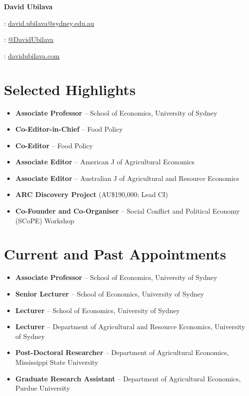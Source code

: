 \documentclass[10pt]{article}
\begin{document}
	
	
	
	\hspace{0.00in}\Large{\bfseries{David Ubilava \faGraduationCap}}
	\normalsize
	
	\medskip
	
	{\faEnvelope: \href{mailto:david.ubilava@sydney.edu.au}{david.ubilava@sydney.edu.au}}
	
	\smallskip
	
	{\faTwitter: \href{https://twitter.com/DavidUbilava}{@DavidUbilava}}
	
	\smallskip
	
	{\faGlobe: \href{https://davidubilava.com}{davidubilava.com}}
	
	\medskip
	
	
	\section*{Selected Highlights}
	\begin{itemize}
		\item {} \textbf{Associate Professor} -- School of Economics, University of Sydney
		\item {} \textbf{Co-Editor-in-Chief} -- Food Policy
		\item {} \textbf{Co-Editor} -- Food Policy
		\item {} \textbf{Associate Editor} -- American J of Agricultural Economics
		\item {} \textbf{Associate Editor} -- Australian J of Agricultural and Resource Economics
		\item {} \textbf{ARC Discovery Project} (AU\$190,000; Lead CI)
		\item {} \textbf{Co-Founder and Co-Organiser} -- Social Conflict and Political Economy (SCoPE) Workshop
	\end{itemize}
	
	\section*{Current and Past Appointments}
	\begin{itemize}
		\item {} \textbf{Associate Professor} -- School of Economics, University of Sydney
		\item {} \textbf{Senior Lecturer} -- School of Economics, University of Sydney
		\item {} \textbf{Lecturer} -- School of Economics, University of Sydney
		\item {} \textbf{Lecturer} -- Department of Agricultural and Resource Economics, University of Sydney
		\item {} \textbf{Post-Doctoral Researcher} -- Department of Agricultural Economics, Mississippi State University
		\item {} \textbf{Graduate Research Assistant} -- Department of Agricultural Economics, Purdue University
	\end{itemize}
	
\end{document}
